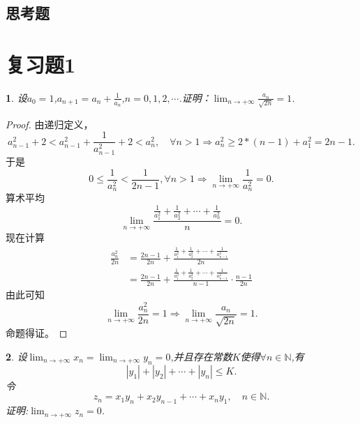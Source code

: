 \documentclass[utf8]{book}
\newtheorem{example}{}[section]             %
\begin{document}
\subsection{思考题}
\section{复习题1}
\begin{example}
设$a_0=1$,$a_{n+1}=a_n+\frac{1}{a_n}$,$n=0,1,2,\cdots$.证明：$\displaystyle\lim_{n\to +\infty}\frac{a_n}{\sqrt{2n}}= 1$.
\end{example}
\begin{proof}
由递归定义，
$$a_{n-1}^2+2 < a_{n-1}^2+\frac{1}{a^2_{n-1}} + 2< a_{n}^2,\quad\forall n > 1\Rightarrow a^2_{n}\geq 2*(n-1) + a_1^2=2n-1.$$
于是
$$0\leq \frac{1}{a_n^2} < \frac{1}{2n-1}, \forall n > 1\Rightarrow \displaystyle\lim_{n\to +\infty}\frac{1}{a_n^2}= 0.$$
算术平均
$$\displaystyle\lim_{n\to +\infty}\frac{\displaystyle\frac{1}{a_1^2}+\frac{1}{a_2^2} +\cdots +\frac{1}{a_n^2}}{n} = 0.$$
现在计算
\begin{equation*}
\begin{split}
\frac{a^2_n}{2n} &= \frac{2n-1}{2n} +\frac{\frac{1}{a_1^2}+\frac{1}{a_2^2} +\cdots +\frac{1}{a_{n-1}^2}}{2n}\\
&=\frac{2n-1}{2n} +\frac{\frac{1}{a_1^2}+\frac{1}{a_2^2} +\cdots +\frac{1}{a_{n-1}^2}}{n-1}\cdot\frac{n-1}{2n}
\end{split}
\end{equation*}
由此可知
$$\displaystyle\lim_{n\to +\infty}\frac{a^2_n}{2n}= 1\Rightarrow \displaystyle\lim_{n\to +\infty}\frac{a_n}{\sqrt{2n}}= 1.$$
命题得证。
\end{proof}
\begin{example}
设$\displaystyle\lim_{n\to +\infty}x_n=\lim_{n\to +\infty}y_n=0$,并且存在常数$K$使得$\forall n\in\mathbb{N}$,有$$|y_1|+|y_2|+\cdots+|y_n|\leq K.$$
令$$z_n=x_1y_n+x_2y_{n-1}+\cdots+x_ny_1,\quad n\in\mathbb{N}.$$证明:$\displaystyle\lim_{n\to +\infty}z_n=0$.
\end{example}
\end{document}
